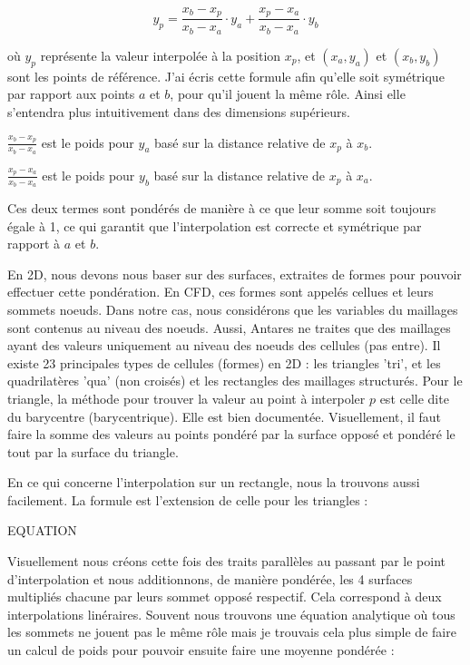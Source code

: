 \[
y_p = \frac{x_b - x_p}{x_b - x_a} \cdot y_a + \frac{x_p - x_a}{x_b - x_a} \cdot y_b
\]

où \( y_p \) représente la valeur interpolée à la position \( x_p \), et \((x_a, y_a)\) et \((x_b, y_b)\) sont les points de référence. J'ai écris cette formule afin qu'elle soit symétrique par rapport aux points \( a \) et \( b \), pour qu'il jouent la même rôle. Ainsi elle s'entendra plus intuitivement dans des dimensions supérieurs.
\vspace{0.5cm}

        \( \frac{x_b - x_p}{x_b - x_a} \) est le poids pour \( y_a \) basé sur la distance relative de \( x_p \) à \( x_b \).

        \( \frac{x_p - x_a}{x_b - x_a} \) est le poids pour \( y_b \) basé sur la distance relative de \( x_p \) à \( x_a \).\vspace{0.5cm}

Ces deux termes sont pondérés de manière à ce que leur somme soit toujours égale à 1, ce
qui garantit que l'interpolation est correcte et symétrique par rapport à \( a \) et \( b \).\vspace{0.5cm}

En 2D, nous devons nous baser sur des surfaces, extraites de formes pour pouvoir effectuer cette pondération. En CFD, ces formes sont appelés cellues et leurs sommets noeuds. Dans notre cas, nous considérons que les variables du maillages sont contenus au niveau des noeuds. Aussi, Antares ne traites que des maillages ayant des valeurs uniquement au niveau des noeuds des cellules (pas entre).
Il existe 23 principales types de cellules (formes) en 2D : les triangles 'tri', et les quadrilatères 'qua' (non croisés) et les rectangles des maillages structurés.
Pour le triangle, la méthode pour trouver la valeur au point à interpoler \( p \) est celle dite du barycentre (barycentrique).
Elle est bien documentée. Visuellement, il faut faire la somme des valeurs au points pondéré par la surface opposé et pondéré le tout par la surface du triangle.

En ce qui concerne l'interpolation sur un rectangle, nous la trouvons aussi facilement. La formule est l'extension de celle pour les triangles :

EQUATION

Visuellement nous créons cette fois des traits parallèles au passant par le point d'interpolation et nous additionnons, de manière pondérée, les 4 surfaces multipliés chacune par leurs sommet opposé respectif. Cela correspond à deux interpolations linéraires. Souvent nous trouvons une équation analytique où tous les sommets ne jouent pas le même rôle mais je trouvais cela plus simple de faire un calcul de poids pour pouvoir ensuite faire une moyenne pondérée :

